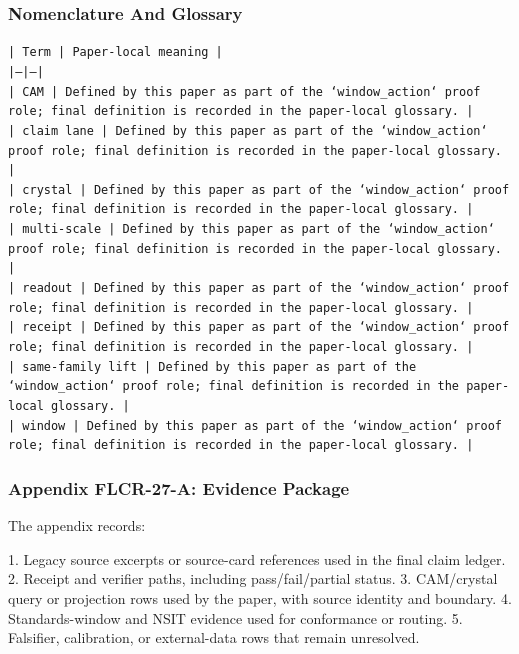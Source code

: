 \documentclass[11pt]{article}
\begin{document}
\subsubsection*{Nomenclature And Glossary}

\noindent\texttt{| Term | Paper-local meaning |}\\
\noindent\texttt{|---|---|}\\
\noindent\texttt{| CAM | Defined by this paper as part of the `window\_action` proof role; final definition is recorded in the paper-local glossary. |}\\
\noindent\texttt{| claim lane | Defined by this paper as part of the `window\_action` proof role; final definition is recorded in the paper-local glossary. |}\\
\noindent\texttt{| crystal | Defined by this paper as part of the `window\_action` proof role; final definition is recorded in the paper-local glossary. |}\\
\noindent\texttt{| multi-scale | Defined by this paper as part of the `window\_action` proof role; final definition is recorded in the paper-local glossary. |}\\
\noindent\texttt{| readout | Defined by this paper as part of the `window\_action` proof role; final definition is recorded in the paper-local glossary. |}\\
\noindent\texttt{| receipt | Defined by this paper as part of the `window\_action` proof role; final definition is recorded in the paper-local glossary. |}\\
\noindent\texttt{| same-family lift | Defined by this paper as part of the `window\_action` proof role; final definition is recorded in the paper-local glossary. |}\\
\noindent\texttt{| window | Defined by this paper as part of the `window\_action` proof role; final definition is recorded in the paper-local glossary. |}\\

\subsubsection*{Appendix FLCR-27-A: Evidence Package}

The appendix records:

1. Legacy source excerpts or source-card references used in the final claim ledger.
2. Receipt and verifier paths, including pass/fail/partial status.
3. CAM/crystal query or projection rows used by the paper, with source identity and boundary.
4. Standards-window and NSIT evidence used for conformance or routing.
5. Falsifier, calibration, or external-data rows that remain unresolved.
\end{document}
